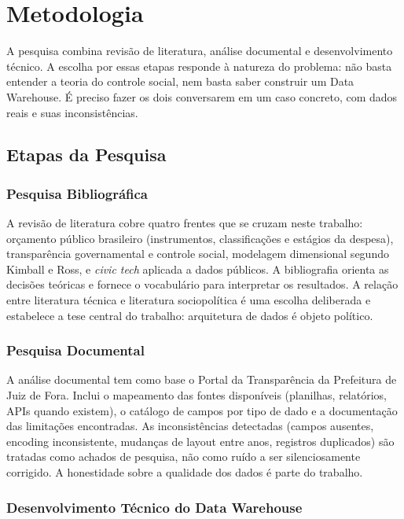 \chapter{Metodologia}
\label{cap:metodologia}

A pesquisa combina revisão de literatura, análise documental e desenvolvimento técnico. A escolha por essas etapas responde à natureza do problema: não basta entender a teoria do controle social, nem basta saber construir um Data Warehouse. É preciso fazer os dois conversarem em um caso concreto, com dados reais e suas inconsistências.

\section{Etapas da Pesquisa}

\subsection*{Pesquisa Bibliográfica}

A revisão de literatura cobre quatro frentes que se cruzam neste trabalho: orçamento público brasileiro (instrumentos, classificações e estágios da despesa), transparência governamental e controle social, modelagem dimensional segundo Kimball e Ross, e \textit{civic tech} aplicada a dados públicos. A bibliografia orienta as decisões teóricas e fornece o vocabulário para interpretar os resultados. A relação entre literatura técnica e literatura sociopolítica é uma escolha deliberada e estabelece a tese central do trabalho: arquitetura de dados é objeto político.

\subsection*{Pesquisa Documental}

A análise documental tem como base o Portal da Transparência da Prefeitura de Juiz de Fora. Inclui o mapeamento das fontes disponíveis (planilhas, relatórios, APIs quando existem), o catálogo de campos por tipo de dado e a documentação das limitações encontradas. As inconsistências detectadas (campos ausentes, encoding inconsistente, mudanças de layout entre anos, registros duplicados) são tratadas como achados de pesquisa, não como ruído a ser silenciosamente corrigido. A honestidade sobre a qualidade dos dados é parte do trabalho.

\subsection*{Desenvolvimento Técnico do Data Warehouse}

